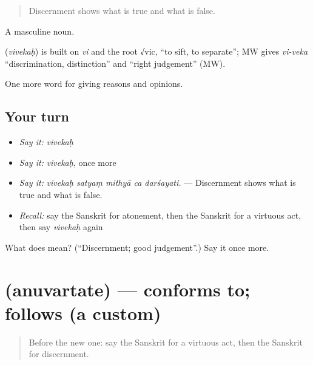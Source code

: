 \begin{quote}
Discernment shows what is true and what is false.
\end{quote}

A masculine noun.

\begin{cousinweb}
\textbf{} (\emph{vivekaḥ}) is built on \emph{vi} and the root √vic, \textquotedblleft{}to sift, to separate\textquotedblright{}; MW gives \emph{vi-veka} \textquotedblleft{}discrimination, distinction\textquotedblright{} and \textquotedblleft{}right judgement\textquotedblright{} (MW).
\end{cousinweb}

\begin{grammarlens}[title={What you've built}]
One more word for giving reasons and opinions.
\end{grammarlens}

\subsection*{Your turn}
\begin{itemize}
\raggedright
  \item \emph{Say it:} \emph{vivekaḥ}
  \item \emph{Say it:} \emph{vivekaḥ}, once more
  \item \emph{Say it:} \emph{vivekaḥ satyaṃ mithyā ca darśayati.} — Discernment shows what is true and what is false.
  \item \emph{Recall:} say the Sanskrit for atonement, then the Sanskrit for a virtuous act, then say \emph{vivekaḥ} again
\end{itemize}

\begin{tcolorbox}[breakable,colback=teal!4,colframe=teal!35!black,title={Before you move on}]
What does  mean? (\textquotedblleft{}Discernment; good judgement\textquotedblright{}.) Say it once more.
\end{tcolorbox}
\section[\texorpdfstring{\sk{अनुवर्तते} (anuvartate)}{अनुवर्तते (anuvartate)}]{ (anuvartate) — conforms to; follows (a custom)}

\label{lesson:SA-C351-anuvartate}



\begin{quote}
Before the new one: say the Sanskrit for a virtuous act, then the Sanskrit for discernment.
\end{quote}

